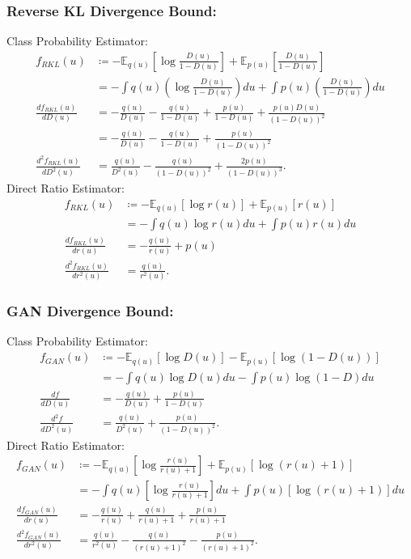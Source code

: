 \documentclass[honours,12pt]{unswthesis}
\newcommand{\E}{\mathbb{E}}
\numberwithin{equation}{section}
\theoremstyle{definition}
\begin{document}
\subsubsection*{\textbf{Reverse KL Divergence Bound}:}
Class Probability Estimator:
\begin{align*}
f_{RKL}(u)&\coloneqq-\E_{q(u)}\left[\log \frac{D(u)}{1-D(u)}\right]+\E_{p(u)}\left[\frac{D(u)}{1-D(u)}\right]\\
&=-\int q(u)\left(\log \frac{D(u)}{1-D(u)}\right)du+\int p(u)\left(\frac{D(u)}{1-D(u)}\right)du\\
\frac{df_{RKL}(u)}{dD(u)}&=-\frac{q(u)}{D(u)}-\frac{q(u)}{1-D(u)}+\frac{p(u)}{1-D(u)}+\frac{p(u)D(u)}{(1-D(u))^2}\\
&=-\frac{q(u)}{D(u)}-\frac{q(u)}{1-D(u)}+\frac{p(u)}{(1-D(u))^2}\\
\frac{d^2f_{RKL}(u)}{dD^2(u)}&=\frac{q(u)}{D^2(u)}-\frac{q(u)}{(1-D(u))^2}+\frac{2p(u)}{(1-D(u))^3}.
\end{align*}
Direct Ratio Estimator:
\begin{align*}
f_{RKL}(u)&\coloneqq-\E_{q(u)}[\log r(u)]+\E_{p(u)}[r(u)]\\
&=-\int q(u)\log r(u) du+\int p(u)r(u)du\\
\frac{df_{RKL}(u)}{dr(u)}&=-\frac{q(u)}{r(u)}+p(u)\\
\frac{d^2f_{RKL}(u)}{dr^2(u)}&=\frac{q(u)}{r^2(u)}.
\end{align*}
\subsubsection*{\textbf{GAN Divergence Bound}:}
Class Probability Estimator:
\begin{align*}
f_{GAN}(u)&\coloneqq-\E_{q(u)}[\log D(u)]-\E_{p(u)}[\log (1-D(u))]\\
&=-\int q(u)\log D(u) du -\int p(u)\log(1-D)du\\
\frac{df}{dD(u)}&=-\frac{q(u)}{D(u)}+\frac{p(u)}{1-D(u)}\\
\frac{d^2f}{dD^2(u)}&=\frac{q(u)}{D^2(u)}+\frac{p(u)}{(1-D(u))^2}.
\end{align*}
Direct Ratio Estimator:
\begin{align*}
f_{GAN}(u)&\coloneqq-\E_{q(u)}\left[\log \frac{r(u)}{r(u)+1}\right]+\E_{p(u)}\left[\log(r(u)+1)\right]\\
&=-\int q(u)\left[\log \frac{r(u)}{r(u)+1}\right]du+\int p(u)\left[\log(r(u)+1)\right]du\\
\frac{df_{GAN}(u)}{dr(u)}&=-\frac{q(u)}{r(u)}+\frac{q(u)}{r(u)+1}+\frac{p(u)}{r(u)+1}\\
\frac{d^2f_{GAN}(u)}{dr^2(u)}&=\frac{q(u)}{r^2(u)}-\frac{q(u)}{(r(u)+1)^2}-\frac{p(u)}{(r(u)+1)^2}.
\end{align*}
\end{document}
